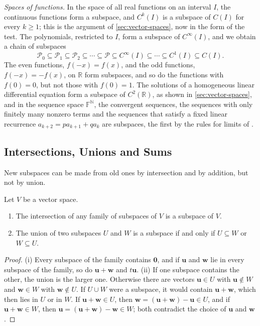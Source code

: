 \emph{Spaces of functions.} In the space of all real functions on an interval $I$, the continuous functions form a subspace, and $C^k(I)$ is a subspace of $C(I)$ for every $k\ge1$; this is the argument of \cref{sec:vector-spaces}, now in the form of the test. The polynomials, restricted to $I$, form a subspace of $C^\infty(I)$, and we obtain a chain of subspaces
\[
\mathcal P_0\subseteq\mathcal P_1\subseteq\mathcal P_2\subseteq\cdots\subseteq\mathcal P\subseteq C^\infty(I)\subseteq\cdots\subseteq C^1(I)\subseteq C(I).
\]
The even functions, $f(-x)=f(x)$, and the odd functions, $f(-x)=-f(x)$, on $\mathbb R$ form subspaces, and so do the functions with $f(0)=0$, but not those with $f(0)=1$. The solutions of a homogeneous linear differential equation form a subspace of $C^2(\mathbb R)$, as shown in \cref{sec:vector-spaces}, and in the sequence space $\mathbb F^{\mathbb N}$, the convergent sequences, the sequences with only finitely many nonzero terms and the sequences that satisfy a fixed linear recurrence $a_{k+2}=pa_{k+1}+qa_k$ are subspaces, the first by the rules for limits of .

\subsection{Intersections, Unions and Sums}

New subspaces can be made from old ones by intersection and by addition, but not by union.

\begin{proposition}
\label{prop:intersection}
Let $V$ be a vector space.
\begin{enumerate}
\item The intersection of any family of subspaces of $V$ is a subspace of $V$.
\item The union of two subspaces $U$ and $W$ is a subspace if and only if $U\subseteq W$ or $W\subseteq U$.
\end{enumerate}
\end{proposition}

\begin{proof}
(i) Every subspace of the family contains $\mathbf 0$, and if $\mathbf u$ and $\mathbf w$ lie in every subspace of the family, so do $\mathbf u+\mathbf w$ and $t\mathbf u$. (ii) If one subspace contains the other, the union is the larger one. Otherwise there are vectors $\mathbf u\in U$ with $\mathbf u\notin W$ and $\mathbf w\in W$ with $\mathbf w\notin U$. If $U\cup W$ were a subspace, it would contain $\mathbf u+\mathbf w$, which then lies in $U$ or in $W$. If $\mathbf u+\mathbf w\in U$, then $\mathbf w=(\mathbf u+\mathbf w)-\mathbf u\in U$, and if $\mathbf u+\mathbf w\in W$, then $\mathbf u=(\mathbf u+\mathbf w)-\mathbf w\in W$; both contradict the choice of $\mathbf u$ and $\mathbf w$.
\end{proof}

